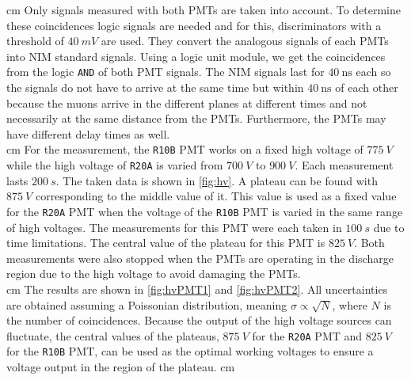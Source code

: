  cm
Only signals measured with both PMTs are taken into account. To determine these coincidences 
logic signals are needed and for this, discriminators with a threshold of $\SI{40}{mV}$ are used. 
They convert the analogous signals of each PMTs into NIM standard signals. Using a logic unit module, we get
the coincidences from the logic \texttt{AND} of both PMT signals. The NIM signals 
last for $\SI{40}{\ns}$ each so the signals do not have to arrive at the same time but within 
$\SI{40}{\ns}$ of each other because the muons arrive in the different planes at different times 
and not necessarily at the same distance from the PMTs. Furthermore, the PMTs may have different
delay times as well.\\
 cm
For the measurement, the \texttt{R10B} PMT works on a fixed high voltage of $\SI{775}{V}$ while the high voltage of 
\texttt{R20A} is varied from $\SI{700}{V}$ to $\SI{900}{V}$. Each measurement lasts $\SI{200}{s}$.
The taken data is shown in \autoref{fig:hv}. A plateau can be found with $\SI{875}{V}$ corresponding to the middle value 
of it. This value is used as a fixed value for the \texttt{R20A} PMT when the voltage of the \texttt{R10B}
PMT is varied in the same range of high voltages. The measurements for this PMT were each taken in $\SI{100}{s}$ due to 
time limitations.
The central value of the plateau for this PMT is $\SI{825}{V}$.
Both measurements were also stopped when the PMTs are operating in the discharge region due to the high voltage to avoid damaging the PMTs.\\
 cm
The results are shown in \autoref{fig:hvPMT1} and \autoref{fig:hvPMT2}. All uncertainties are obtained 
assuming a Poissonian distribution, meaning $\sigma \propto \sqrt{N}$, where $N$ is the number of
coincidences. Because the output of the high voltage sources can fluctuate, the central values of the plateaus, $\SI{875}{V}$ for the \texttt{R20A} PMT and 
$\SI{825}{V}$ for the \texttt{R10B} PMT, can be used as the optimal working voltages to ensure
a voltage output in the region of the plateau.
 cm
